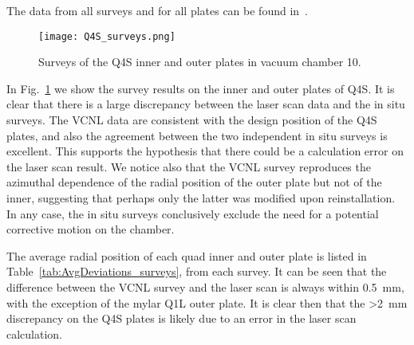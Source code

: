 The data from all surveys and for all plates can be found in~\cite{Kargiantoulakis:doc16324}.



\begin{figure}[]
	\centering
	\texttt{[image: Q4S\_surveys.png]}
	\caption{Surveys of the Q4S inner and outer plates in vacuum chamber 10.
	}\label{fig:Q4S_surveys}
\end{figure}



In Fig.~\ref{fig:Q4S_surveys} we show the survey results on the inner and outer plates of Q4S. 
It is clear that there is a large discrepancy between the laser scan data and the in situ surveys. The VCNL data are consistent with the design position of the Q4S plates, and also the agreement between the two independent in situ surveys is excellent. 
This supports the hypothesis that there could be a calculation error on the laser scan result.
We notice also that the VCNL survey reproduces the azimuthal dependence of the radial position of the outer plate but not of the inner, suggesting that perhaps only the latter was modified upon reinstallation.
In any case, the in situ surveys conclusively exclude the need for a potential corrective motion on the chamber.

The average radial position of each quad inner and outer plate is listed in Table~\ref{tab:AvgDeviations_surveys}, from each survey. 
It can be seen that the difference between the VCNL survey and the laser scan is always within \SI{0.5}{mm}, with the exception of the mylar Q1L outer plate. It is clear then that the >\SI{2}{mm} discrepancy on the Q4S plates is likely due to an error in the laser scan calculation.


